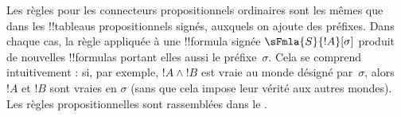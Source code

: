 \documentclass[../../../include/open-logic-section]{subfiles}
\begin{document}


Les règles pour les connecteurs propositionnels ordinaires sont les
mêmes que dans les !!{tableau}s propositionnels signés, auxquels on
ajoute des préfixes. Dans chaque cas, la règle appliquée à une
!!{formula} signée $\sFmla{S}{!A}[\sigma]$ produit de nouvelles
!!{formula}s portant elles aussi le préfixe~$\sigma$. Cela se
comprend intuitivement : si, par exemple, $!A \land !B$ est vraie au
monde désigné par~$\sigma$, alors $!A$ et $!B$ sont vraies en
$\sigma$ (sans que cela impose leur vérité aux autres mondes). Les
règles propositionnelles sont rassemblées dans le
.
\end{document}
